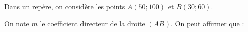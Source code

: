 
Dans un repère, on considère les points $A(50;100)$ et $B(30;60)$.

On note $m$ le coefficient directeur de la droite $(AB)$. On peut affirmer que :

\smallskip
{}
